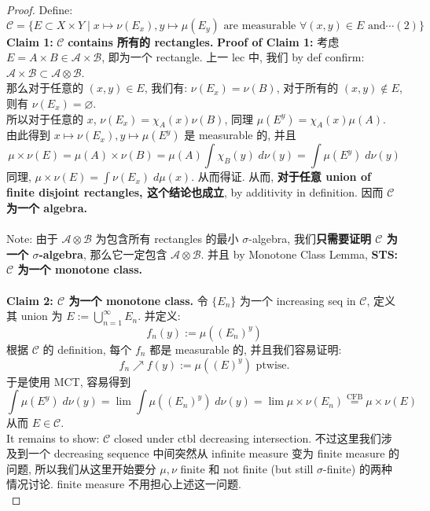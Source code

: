 \documentclass[lang=cn,11pt]{elegantbook}
\begin{document}
\begin{proof}
Define:    $$\mathcal{C} = \{ E \subset X \times Y \mid x \mapsto \nu(E_x), y \mapsto \mu(E_y) \text{ are measurable } \forall (x,y)\in E \text{ and} \cdots (2)  \}$$
\textbf{Claim 1: }$\mathcal{C}$\textbf{ contains 所有的 rectangles.}
\textbf{Proof of Claim 1:} 考虑 $E = A\times B \in \mathcal{A}\times \mathcal{B}$, 即为一个 rectangle. 上一 lec 中, 我们 by def confirm: $\mathcal{A}\times \mathcal{B}\subset  \mathcal{A}\otimes \mathcal{B} $.\\
那么对于任意的 $(x,y) \in E$, 我们有: \(\nu(E_x) =  \nu(B)\), 对于所有的 $(x,y) \not \in E$, 则有 \(\nu(E_x) =  \varnothing\).\\
所以对于任意的 $x$, $\nu(E_x) =  \chi_A(x) \nu(B)$, 同理 $\mu(E^y) = \chi_A(x) \mu (A)$. \\
由此得到 $x\mapsto \nu(E_x), y\mapsto \mu(E^y)$ 是 measurable 的, 并且 \[
\mu \times \nu (E) = \mu(A) \times \nu(B) = \mu(A) \int \chi_B(y) \;d \nu(y) = \int \mu(E^y) \; d  \nu(y) 
\]
同理, \(\mu\times \nu (E) = \int \nu (E_x) \; d\mu(x)   \). 从而得证. 从而, \textbf{对于任意 union of finite disjoint rectangles, 这个结论也成立}, by additivity in definition. 因而 $\mathcal{C}$ \textbf{为一个 algebra.}\\\\
Note: 由于 $\mathcal{A} \otimes \mathcal{B}$ 为包含所有 rectangles 的最小 $\sigma$-algebra, 我们\textbf{只需要证明 $\mathcal{C}$ 为一个 $\sigma$-algebra}, 那么它一定包含 $\mathcal{A} \otimes \mathcal{B}$. 并且 by Monotone Class Lemma, \textbf{STS: $\mathcal{C}$ 为一个 monotone class.}\\\\
\textbf{Claim 2: $\mathcal{C}$ 为一个 monotone class.}
令 $\{E_n\}$ 为一个 increasing seq in $\mathcal{C}$, 定义其 union 为 $E := \bigcup_{n=1}^\infty E_n$. 并定义: \[f_n(y) := \mu((E_n)^y)\]
根据 $\mathcal{C}$ 的 definition, 每个 $f_n$ 都是 measurable 的, 并且我们容易证明: \[f_n \nearrow f(y) := \mu((E)^y) \text{ ptwise.}\]于是使用 MCT, 容易得到 \[
\int \mu(E^y) \; d\nu(y) = \lim \int \mu((E_n)^y) \; d\nu(y) = \lim \mu \times \nu(E_n) \overset{\text{CFB}}{=} \mu \times \nu (E)
\]
从而 $E \in \mathcal{C}$. \\
It remains to show: $\mathcal{C}$ closed under ctbl decreasing intersection. 不过这里我们涉及到一个 decreasing sequence 中间突然从 infinite measure 变为 finite measure 的问题, 所以我们从这里开始要分 $\mu ,\nu$ finite 和 not finite (but still $\sigma$-finite) 的两种情况讨论. finite measure 不用担心上述这一问题.\\

\end{proof}
\end{document}
